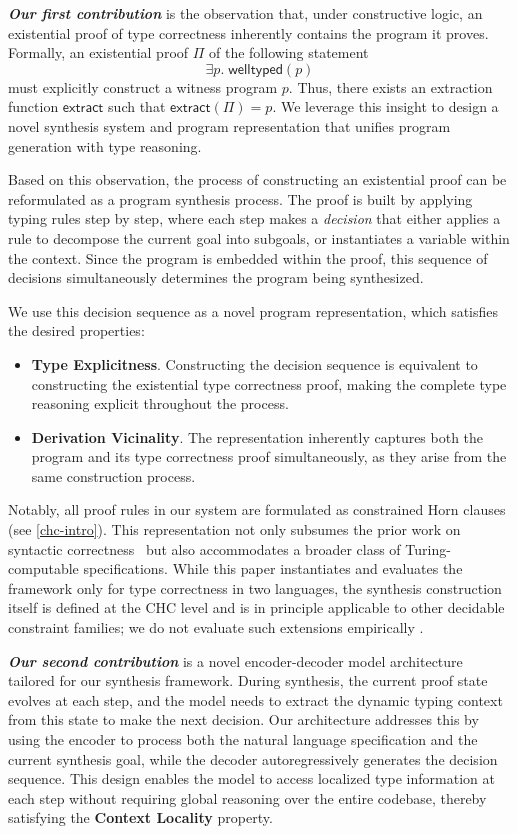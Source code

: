 \documentclass[manuscript,screen]{acmart}
\begin{document}
\textbf{\textit{Our first contribution}} is the observation that, under constructive logic, an existential proof of type correctness inherently contains the program it proves. Formally, an existential proof $\Pi$ of the following statement
\[
\exists p.\; \mathsf{welltyped}(p)
\]
must explicitly construct a witness program $p$. Thus, there exists an extraction function $\mathsf{extract}$ such that $\mathsf{extract}(\Pi) = p$. We leverage this insight to design a novel synthesis system and program representation that unifies program generation with type reasoning.

Based on this observation, the process of constructing an existential proof can be reformulated as a program synthesis process. The proof is built by applying typing rules step by step, where each step makes a \textit{decision} that either applies a rule to decompose the current goal into subgoals, or instantiates a variable within the context. Since the program is embedded within the proof, this sequence of decisions simultaneously determines the program being synthesized.

We use this decision sequence as a novel program representation, which satisfies the desired properties:
\begin{itemize}
    \item \textbf{Type Explicitness}. Constructing the decision sequence is equivalent to constructing the existential type correctness proof, making the complete type reasoning explicit throughout the process.
    \item \textbf{Derivation Vicinality}. The representation inherently captures both the program and its type correctness proof simultaneously, as they arise from the same construction process.
\end{itemize}

Notably, all proof rules in our system are formulated as constrained Horn clauses (see \autoref{chc-intro}). This representation not only subsumes the prior work on syntactic correctness~\cite{DBLP:conf/icse/ZhuL000C24,DBLP:conf/acl/LiangZ0LLXCZZZC25} but also accommodates a broader class of Turing-computable specifications. While this paper    {\color{revblue}instantiates and evaluates the framework only for type correctness in two languages, the synthesis construction itself is defined at the CHC level and is in principle applicable to other decidable constraint families; we do not evaluate such extensions empirically} .

\textbf{\textit{Our second contribution}} is a novel encoder-decoder model architecture tailored for our synthesis framework. During synthesis, the current proof state evolves at each step, and the model needs to extract the dynamic typing context from this state to make the next decision. Our architecture addresses this by using the encoder to process both the natural language specification and the current synthesis goal, while the decoder autoregressively generates the decision sequence. This design enables the model to access localized type information at each step without requiring global reasoning over the entire codebase, thereby satisfying the \textbf{Context Locality} property.
\end{document}
